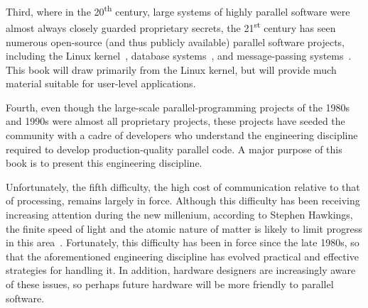 Third, where in the 20\textsuperscript{th} century, large systems of
highly parallel software were almost always closely guarded proprietary
secrets, the 21\textsuperscript{st} century has seen numerous
open-source (and thus publicly available) parallel software projects,
including the Linux kernel~\cite{Torvalds2.6kernel},
database systems~\cite{PostgreSQL2008,MySQL2008},
and message-passing systems~\cite{OpenMPI2008}.
This book will draw primarily from the Linux kernel, but will
provide much material suitable for user-level applications.

Fourth, even though the large-scale parallel-programming projects of
the 1980s and 1990s were almost all proprietary projects, these
projects have seeded the community with a cadre of developers who
understand the engineering discipline required to develop production-quality
parallel code.
A major purpose of this book is to present this engineering discipline.

Unfortunately, the fifth difficulty, the high cost of communication
relative to that of processing, remains largely in force.
Although this difficulty has been receiving increasing attention during
the new millenium, according to Stephen Hawkings,
the finite speed of light and the atomic
nature of matter is likely to limit progress in this
area~\cite{BryanGardiner2007,GordonMoore03a}.
Fortunately, this difficulty has been in force since the late 1980s,
so that the aforementioned engineering discipline has evolved practical
and effective strategies for handling it.
In addition, hardware designers are increasingly aware of these issues,
so perhaps future hardware will be more friendly to parallel software.

